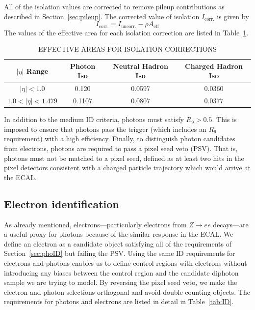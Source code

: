 All of the isolation values are corrected to remove pileup contributions as described in Section~\ref{sec:pileup}. The corrected value of isolation $I_{\mathrm{corr.}}$ is given by 
\begin{equation}
I_{\mathrm{corr.}} = I_{\mathrm{uncorr.}} - \rho A_{\mathrm{eff}}
\end{equation}
The values of the effective area for each isolation correction are listed in Table~\ref{tab:EA}.

\begin{table}[ht]
    \caption{EFFECTIVE AREAS FOR ISOLATION CORRECTIONS}
    \centering
    \begin{tabular}{ | c | c | c | c |}
        \hline
        	\hline
        \textbf{$|\eta|$ Range} & \textbf{Photon Iso} & \textbf{Neutral Hadron Iso} & \textbf{Charged Hadron Iso} \\ [0.5ex]
        \hline
        	$|\eta| < 1.0 $                 & 0.120   &  0.0597 & 0.0360\\
	$ 1.0 < |\eta| < 1.479 $   & 0.1107 & 0.0807 & 0.0377 \\
		 \hline
           \hline
    \end{tabular}
    \label{tab:EA}
\end{table}
In addition to the medium ID criteria, photons must satisfy $R_9 > 0.5$. This is imposed to ensure that photons pass the trigger (which includes an $R_9$ requirement) with a high efficiency. Finally, to distinguish photon candidates from electrons, photons are required to pass a pixel seed veto (PSV). That is, photons must not be matched to a pixel seed, defined as at least two hits in the pixel detectors consistent with a charged particle trajectory which would arrive at the ECAL.

\subsection{Electron identification}
\label{sec:eleID}
As already mentioned, electrons---particularly electrons from $Z\rightarrow ee$ decays---are a useful proxy for photons because of the similar response in the ECAL. We define an electron as a candidate object satisfying all of the requirements of Section~\ref{sec:phoID} but failing the PSV. Using the same ID requirements for electrons and photons enables us to define control regions with electrons without introducing any biases between the control region and the candidate diphoton sample we are trying to model. By reversing the pixel seed veto, we make the electron and photon selections orthogonal and avoid double-counting objects. The requirements for photons and electrons are listed in detail in Table~\ref{tab:ID}. 

